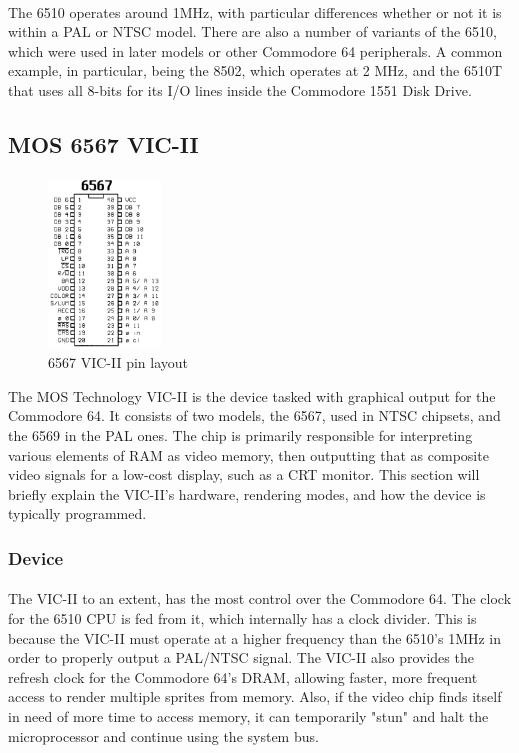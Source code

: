 \documentclass{article}
\begin{document}
\paragraph{}
The 6510 operates around 1MHz, with particular differences whether or not it is within a PAL or NTSC model. There are also a number of variants of the 6510, which were used in later models or other Commodore 64 peripherals. A common example, in particular, being the 8502, which operates at 2 MHz, and the 6510T that uses all 8-bits for its I/O lines inside the Commodore 1551 Disk Drive.

\subsection{MOS 6567 VIC-II}
\paragraph{}
\begin{figure}
\vspace{-20pt}
\begin{center}
\includegraphics[width=3cm]{6567}
\caption{6567 VIC-II pin layout}
\end{center}
\end{figure}
The MOS Technology VIC-II is the device tasked with graphical output for the Commodore 64. It consists of two models, the 6567, used in NTSC chipsets, and the 6569 in the PAL ones. The chip is primarily responsible for interpreting various elements of RAM as video memory, then outputting that as composite video signals for a low-cost display, such as a CRT monitor. This section will briefly explain the VIC-II's hardware, rendering modes, and how the device is typically programmed.

\subsubsection{Device}
\paragraph{}
The VIC-II to an extent, has the most control over the Commodore 64. The clock for the 6510 CPU is fed from it, which internally has a clock divider. This is because the VIC-II must operate at a higher frequency than the 6510's 1MHz in order to properly output a PAL/NTSC signal. The VIC-II also provides the refresh clock for the Commodore 64's DRAM, allowing faster, more frequent access to render multiple sprites from memory. Also, if the video chip finds itself in need of more time to access memory, it can temporarily "stun" and halt the microprocessor and continue using the system bus. 
\end{document}
